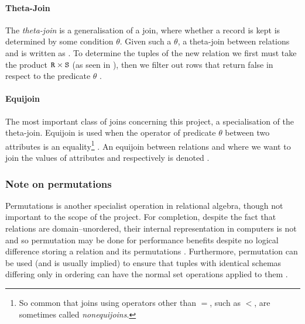 \paragraph{Theta-Join} The \emph{theta-join} is a generalisation of a join, where whether a record is kept is determined by some condition $\theta$. Given such a $\theta$, a theta-join between relations  and  is written as . To determine the tuples of the new relation  we first must take the product $\mathtt{R} \times \mathtt{S}$ (as seen in ), then we filter out rows that return false in respect to the predicate $\theta$ \cite{DatabaseSystems}.

\paragraph{Equijoin} The most important class of joins concerning this project, a specialisation of the theta-join. Equijoin is used when the operator of predicate $\theta$ between two attributes is an equality\footnote{So common that joins using operators other than $=$, such as $<$, are sometimes called \emph{nonequijoins}\cite{JoinProcessing}.} \cite{JoinProcessing}. An equijoin between relations  and  where we want to join the values of attributes  and  respectively is denoted .
\subsubsection{Note on permutations}
Permutations is another specialist operation in relational algebra, though not important to the scope of the project. For completion, despite the fact that relations are domain--unordered, their internal representation in computers is not and so permutation may be done for performance benefits despite no logical difference storing a relation and its permutations \cite{RelationalModel}. Furthermore, permutation can be used (and is usually implied) to ensure that tuples with identical schemas differing only in ordering can have the normal set operations applied to them \cite{DatabaseSystems}.
